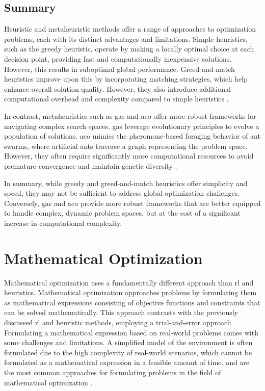 \subsection{Summary}
Heuristic and metaheuristic methods offer a range of approaches to optimization problems, each with its distinct advantages and limitations.
Simple heuristics, such as the greedy heuristic, operate by making a locally optimal choice at each decision point, providing fast and computationally inexpensive solutions.
However, this results in suboptimal global performance.
Greed-and-match heuristics improve upon this by incorporating matching strategies, which help enhance overall solution quality.
However, they also introduce additional computational overhead and complexity compared to simple heuristics \cite{russell_modern_1995}.

In contrast, metaheuristics such as \glspl{ga} and \gls{aco} offer more robust frameworks for navigating complex search spaces.
\glspl{ga} leverage evolutionary principles to evolve a population of solutions.
\gls{aco} mimics the pheromone-based foraging behavior of ant swarms, where artificial ants traverse a graph representing the problem space.
However, they often require significantly more computational resources to avoid premature convergence and maintain genetic diversity \cite{holland_adaptation_1992, dorigo_ant_1997}.

In summary, while greedy and greed-and-match heuristics offer simplicity and speed, they may not be sufficient to address global optimization challenges.
Conversely, \glspl{ga} and \gls{aco} provide more robust frameworks that are better equipped to handle complex, dynamic problem spaces, but at the cost of a significant increase in computational complexity.

\section{Mathematical Optimization}\label{sec:background-mathematical_optimization}
Mathematical optimization uses a fundamentally different approach than \gls{rl} and heuristics.
Mathematical optimization approaches problems by formulating them as mathematical expressions consisting of objective functions and constraints that can be solved mathematically.
This approach contrasts with the previously discussed \gls{rl} and heuristic methods, employing a trial-and-error approach.
Formulating a mathematical expression based on real-world problems comes with some challenges and limitations.
A simplified model of the environment is often formulated due to the high complexity of real-world scenarios, which cannot be formulated as a mathematical expression in a feasible amount of time.
 and  are the most common approaches for formulating problems in the field of mathematical optimization \cite{boyd_convex_2004}.

